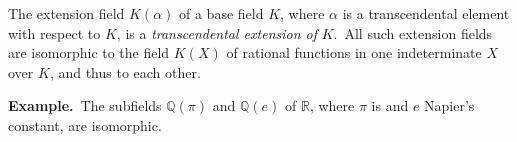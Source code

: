 \documentclass[12pt]{article}
\begin{document}
The extension field $K(\alpha)$ of a base field $K$, where $\alpha$ is a transcendental element with respect to $K$, is a \emph{ transcendental extension of} $K$.\, All such extension fields are isomorphic to the field $K(X)$ of rational functions in one indeterminate $X$ over $K$, and thus to each other.

\textbf{Example.}\, The subfields $\mathbb{Q}(\pi)$ and $\mathbb{Q}(e)$ of $\mathbb{R}$, where $\pi$ is  and $e$ Napier's constant, are isomorphic.
\end{document}
